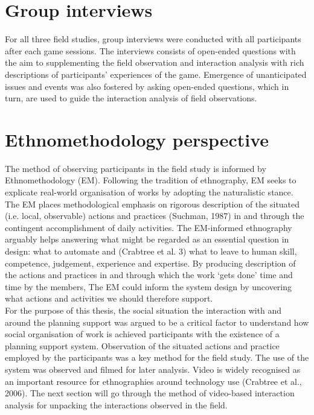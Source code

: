 \section{Group interviews}
For all three field studies, group interviews were conducted with all participants after each game sessions. The interviews consists of open-ended questions with the aim to supplementing the field observation and interaction analysis with rich descriptions of participants' experiences of the game. Emergence of unanticipated issues and events was also fostered by asking open-ended questions, which in turn, are used to guide the interaction analysis of field observations.\\

\section{ Ethnomethodology perspective}
The method of observing participants in the field study is informed by Ethnomethodology (EM). Following the tradition of ethnography, EM seeks to explicate real-world organisation of works by adopting the naturalistic stance. The EM places methodological emphasis on rigorous description of the situated (i.e. local, observable) actions and practices (Suchman, 1987) in and through the contingent accomplishment of daily activities. The EM-informed ethnography arguably helps answering what might be regarded as an essential question in design: what to automate and (Crabtree et al. 3) what to leave to human skill, competence, judgement, experience and expertise. By producing description of the actions and practices in and through which the work `gets done' time and time by the members, The EM could inform the system design by uncovering what actions and activities we should therefore support.\\

For the purpose of this thesis, the social situation the interaction with and around the planning support was argued to be a critical factor to understand how social organisation of work is achieved participants with the existence of a planning support system. Observation of the situated actions and practice employed by the participants was a key method for the field study. The use of the system was observed and filmed for later analysis. Video is widely recognised as an important resource for ethnographies around technology use (Crabtree et al., 2006). The next section will go through the method of video-based interaction analysis for unpacking the interactions observed in the field. \\

